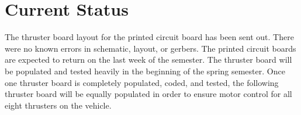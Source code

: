 \section{Current Status}
The thruster board layout for the printed circuit board has been sent out. There were no known errors in schematic, layout, or gerbers. The printed circuit boards are expected to return on the last week of the semester. The thruster board will be populated and tested heavily in the beginning of the spring semester. Once one thruster board is completely populated, coded, and tested, the following thruster board will be equally populated in order to ensure motor control for all eight thrusters on the vehicle.


\pagebreak










